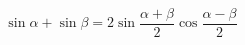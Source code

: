 \documentclass[a4paper, 10pt]{scrartcl}
\begin{document}
\[\sin{\alpha} + \sin{\beta} = 2\sin{\frac{\alpha + \beta}{2}}\cos{\frac{\alpha - \beta}{2}}\]
\end{document}
